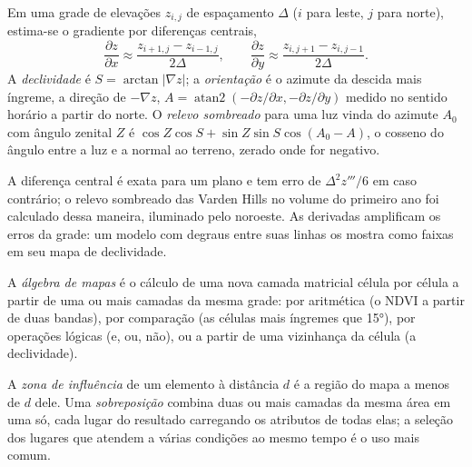\begin{method}\label{met:b3:remote-sensing-gis:slope}
Em uma grade de elevações $z_{i,j}$ de espaçamento $\Delta$ ($i$ para leste, $j$
para norte), estima-se o gradiente por diferenças centrais,
\[
\frac{\partial z}{\partial x} \approx \frac{z_{i+1,j} - z_{i-1,j}}{2\Delta} ,
\qquad
\frac{\partial z}{\partial y} \approx \frac{z_{i,j+1} - z_{i,j-1}}{2\Delta} .
\]
A \emph{declividade} é $S = \arctan|\nabla z|$; a \emph{orientação} é o
azimute da descida mais íngreme, a direção de $-\nabla z$, $A =
\operatorname{atan2}(-\partial z/\partial x, -\partial z/\partial y)$
medido no sentido horário a partir do norte. O \emph{relevo sombreado} para uma luz vinda do
azimute $A_0$ com ângulo zenital $Z$ é $\cos Z\cos S + \sin Z\sin S
\cos(A_0 - A)$, o cosseno do ângulo entre a luz e a normal
ao terreno, zerado onde for negativo.
\end{method}

A diferença central é exata para um plano e tem erro de
$\Delta^2 z'''/6$ em caso contrário; o relevo sombreado das Varden Hills no
volume do primeiro ano foi calculado dessa maneira, iluminado pelo noroeste. As derivadas
amplificam os erros da grade: um modelo com degraus entre suas linhas os mostra
como faixas em seu mapa de declividade.

\begin{definition}\label{def:b3:remote-sensing-gis:map-algebra}
A \emph{álgebra de mapas} é o cálculo de uma nova
camada matricial célula por célula a partir de uma ou mais camadas da mesma grade: por
aritmética (o NDVI a partir de duas bandas), por comparação (as células mais íngremes que
\ang{15}), por operações lógicas (e, ou, não), ou a partir de uma vizinhança
da célula (a declividade).
\end{definition}

\begin{definition}\label{def:b3:remote-sensing-gis:operations}
A \emph{zona de influência} de um elemento à distância $d$ é
a região do mapa a menos de $d$ dele. Uma
\emph{sobreposição} combina duas ou mais camadas da
mesma área em uma só, cada lugar do resultado carregando os atributos de
todas elas; a seleção dos lugares que atendem a várias condições ao mesmo
tempo é o uso mais comum.
\end{definition}

